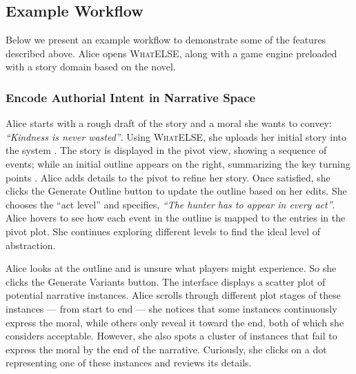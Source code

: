 \subsection{Example Workflow}



Below we present an example workflow to demonstrate some of the features described above. 
Alice opens \textsc{WhatELSE}, along with a game engine preloaded with a story domain based on the novel.

\subsubsection{Encode Authorial Intent in Narrative Space} Alice starts with a rough draft of the story and a moral she wants to convey: {\it ``Kindness is never wasted''}. Using \textsc{WhatELSE}, she uploads her initial story into the system . The story is displayed in the pivot view, showing a sequence of events; while an initial outline appears on the right, summarizing the key turning points . Alice adds details to the pivot to refine her story. Once satisfied, she clicks the Generate Outline button to update the outline based on her edits. She chooses the ``act level'' and specifies, {\it ``The hunter has to appear in every act''}. Alice hovers to see how each event in the outline is mapped to the entries in the pivot plot. She continues exploring different levels to find the ideal level of abstraction.

Alice looks at the outline and is unsure what players might experience. So she clicks the Generate Variants button. The interface displays a scatter plot of potential narrative instances. Alice scrolls through different plot stages of these instances — from start to end — she notices that some instances continuously express the moral, while others only reveal it toward the end, both of which she considers acceptable. However, she also spots a cluster of instances that fail to express the moral by the end of the narrative. Curiously, she clicks on a dot representing one of these instances and reviews its details. 

